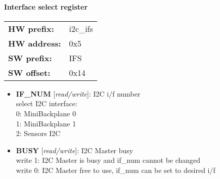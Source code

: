 \paragraph*{Interface select register}\vspace{12pt}

\begin{tabular}{l l }
{\bf HW prefix:}  & i2c\_ifs\\
{\bf HW address:}  & 0x5\\
{\bf SW prefix:}  & IFS\\
{\bf SW offset:}  & 0x14\\
\end{tabular}


\vspace{12pt}
\noindent
{}

\begin{itemize}
\item \begin{small}
{\bf 
IF\_NUM
} [\emph{read/write}]: I2C i/f number
\\
select I2C interface: \\                       0: MiniBackplane 0 \\                       1: MiniBackplane 1 \\                       2: Sensors I2C
\end{small}
\item \begin{small}
{\bf 
BUSY
} [\emph{read/write}]: I2C Master busy
\\
write 1: I2C Master is busy and if\_num cannot be changed \\                       write 0: I2C Master free to use, if\_num can be set to desired i/f
\end{small}
\end{itemize}



